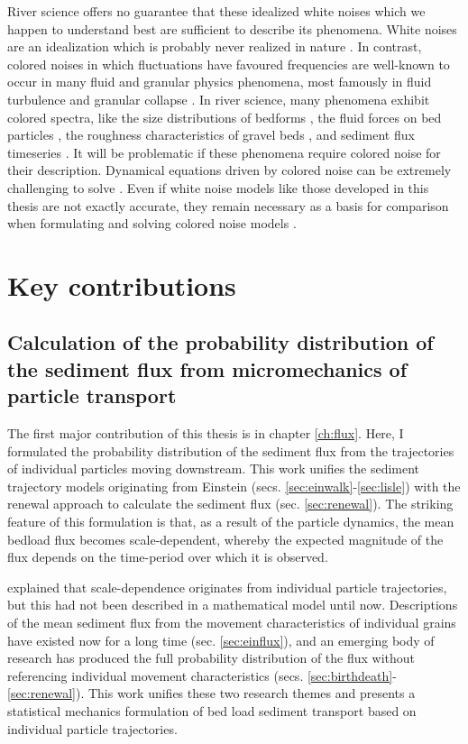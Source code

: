 River science offers no guarantee that these idealized white noises which we happen to understand best are sufficient to describe its phenomena.
White noises are an idealization which is probably never realized in nature \citep{Gardiner1983,Kubo1978}.
In contrast, colored noises in which fluctuations have favoured frequencies are well-known to occur in many fluid and granular physics phenomena, most famously in fluid turbulence \citep{Kolmogorov1941,Nikora2000} and granular collapse \citep{Bak1987,Jensen1998}.
In river science, many phenomena exhibit colored spectra, like the size distributions of bedforms \citep{Nikora1997,Guala2014}, the fluid forces on bed particles \citep{Dwivedi2011, Amir2014}, the roughness characteristics of gravel beds \citep{Aberle2006,Singh2012}, and sediment flux timeseries \citep{Dhont2018,Chartrand2021}.
It will be problematic if these phenomena require colored noise for their description. Dynamical equations driven by colored noise can be extremely challenging to solve \citep{Hanggi1978,Luczka2005,Hanggi2007}.
Even if white noise models like those developed in this thesis are not exactly accurate, they remain necessary as a basis for comparison when formulating and solving colored noise models \citep{Fox1986,Moss1989}.

\section{Key contributions}

\subsection{Calculation of the probability distribution of the sediment flux from micromechanics of particle transport}

The first major contribution of this thesis is in chapter \ref{ch:flux}. Here, I formulated the probability distribution of the sediment flux from the trajectories of individual particles moving downstream. This work unifies the sediment trajectory models originating from Einstein (secs. \ref{sec:einwalk}-\ref{sec:lisle}) with the renewal approach to calculate the sediment flux (sec. \ref{sec:renewal}).
The striking feature of this formulation is that, as a result of the particle dynamics, the mean bedload flux becomes scale-dependent, whereby the expected magnitude of the flux depends on the time-period over which it is observed.

\citet{Ballio2018} explained that scale-dependence originates from individual particle trajectories, but this had not been described in a mathematical model until now.
Descriptions of the mean sediment flux from the movement characteristics of individual grains have existed now for a long time (sec. \ref{sec:einflux}), and an emerging body of research has produced the full probability distribution of the flux without referencing individual movement characteristics (secs. \ref{sec:birthdeath}-\ref{sec:renewal}). 
This work unifies these two research themes and presents a statistical mechanics formulation of bed load sediment transport based on individual particle trajectories.

